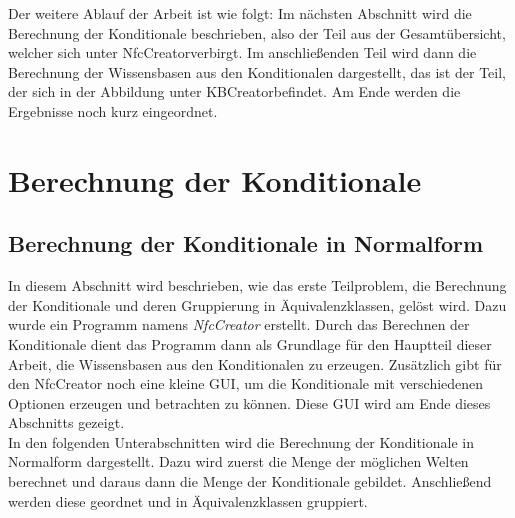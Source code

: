\documentclass[12pt,a4paper]{article}
\begin{document}
Der weitere Ablauf der Arbeit ist wie folgt: Im nächsten Abschnitt wird die Berechnung der Konditionale beschrieben, also der Teil aus der Gesamtübersicht, welcher sich unter \glqq NfcCreator\grqq \space verbirgt. Im anschließenden Teil wird dann die Berechnung der Wissensbasen aus den Konditionalen dargestellt, das ist der Teil, der sich in der Abbildung unter \glqq KBCreator\grqq \space befindet. Am Ende werden die Ergebnisse noch kurz eingeordnet.

\section{Berechnung der Konditionale}

\subsection{Berechnung der Konditionale in Normalform}
\label{sec:nfc}

In diesem Abschnitt wird beschrieben, wie das erste Teilproblem, die Berechnung der Konditionale und deren Gruppierung in Äquivalenzklassen, gelöst wird. Dazu wurde ein Programm namens \textit{NfcCreator} erstellt. Durch das Berechnen der Konditionale dient das Programm dann als Grundlage für den Hauptteil dieser Arbeit, die Wissensbasen aus den Konditionalen zu erzeugen. Zusätzlich gibt für den NfcCreator noch eine kleine GUI, um die Konditionale mit verschiedenen Optionen erzeugen und betrachten zu können. Diese GUI wird am Ende dieses Abschnitts gezeigt. \\
In den folgenden Unterabschnitten wird die Berechnung der Konditionale in Normalform dargestellt. Dazu wird zuerst die Menge der möglichen Welten berechnet und daraus dann die Menge der Konditionale gebildet. Anschließend werden diese geordnet und in Äquivalenzklassen gruppiert.
\end{document}
